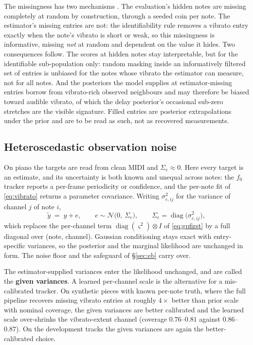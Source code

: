 \documentclass[11pt,a4paper]{report}
\newcommand{\N}{\mathcal{N}}
\begin{document}
The missingness has two mechanisms \cite{rubin1976}. The
evaluation's hidden notes are missing completely at random by
construction, through a seeded coin per note. The estimator's missing
entries are not: the identifiability rule removes a vibrato entry exactly
when the note's vibrato is short or weak, so this missingness is
informative, missing \emph{not} at random and dependent on the value it
hides. Two consequences follow. The scores at hidden notes stay interpretable,
but for the identifiable sub-population only: random masking inside an
informatively filtered set of entries is unbiased for the notes whose
vibrato the estimator can measure, not for all notes. And the posteriors
the model supplies at estimator-missing entries borrow from vibrato-rich
observed neighbours and may therefore be biased toward audible vibrato,
of which the delay posterior's occasional sub-zero stretches are the
visible signature. Filled entries are posterior extrapolations under the
prior and are to be read as such, not as recovered measurements.

\subsection{Heteroscedastic observation noise}
On piano the targets are read from clean MIDI and $\Sigma_e \approx 0$.
Here every target is an estimate, and its uncertainty is both known and
unequal across notes: the $f_0$ tracker reports a per-frame periodicity
or confidence, and the per-note fit of \eqref{eq:vibrato} returns a
parameter covariance. Writing $\sigma_{e,ij}^2$ for the variance of
channel $j$ of note $i$,
\begin{equation}
  \tilde y \;=\; y + e, \qquad
  e \sim \N\bigl(0,\ \Sigma_e\bigr), \qquad
  \Sigma_e = \operatorname{diag}\bigl(\sigma_{e,ij}^2\bigr),
  \label{eq:phase2-noise}
\end{equation}
which replaces the per-channel term $\operatorname{diag}(\varsigma^2)\otimes I$ of
\eqref{eq:gpfirst} by a full diagonal over (note, channel). Gaussian
conditioning stays exact with entry-specific variances, so the posterior and
the marginal likelihood are unchanged in form. The noise floor and the
safeguard of \S\ref{sec:eb} carry over.

The estimator-supplied variances enter the likelihood unchanged, and are
called the \textbf{given variances}. A learned per-channel scale is the
alternative for a mis-calibrated tracker. On synthetic pieces with known
per-note truth, where the full pipeline recovers missing vibrato entries at
roughly $4\times$ better than prior scale with nominal coverage, the given
variances are better calibrated and the learned scale over-shrinks the
vibrato-extent channel (coverage $0.76$--$0.81$ against $0.86$--$0.87$). On
the development tracks the given variances are again the better-calibrated
choice.
\end{document}
